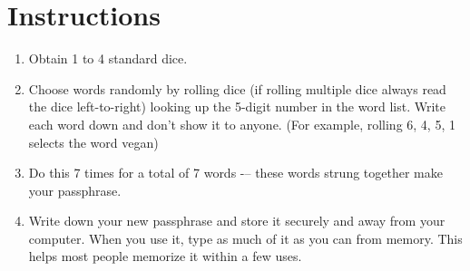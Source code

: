 \documentclass[12pt, oneside]{book}
\begin{document}
	\section*{Instructions}
	\begin{enumerate}
		\item Obtain 1 to 4 standard dice.\\
		\item Choose words randomly by rolling dice (if rolling multiple dice always read the dice left-to-right) looking up the 5-digit number in the word list. Write each word down and don't show it to anyone. (For example, rolling 6, 4, 5, 1 selects the word vegan)\\
		\item Do this 7 times for a total of 7 words -– these words strung together make your passphrase.\\
		\item Write down your new passphrase and store it securely and away from your computer. When you use it, type as much of it as you can from memory. This helps most people memorize it within a few uses.\\
	\end{enumerate}
	\pagebreak
	
\end{document}
